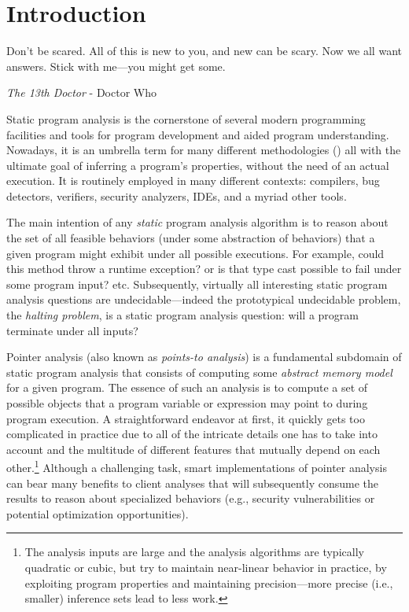 \chapter{Introduction}
\label{chapter:intro}
\epigraph{Don’t be scared. All of this is new to you, and new can be scary. Now we all want answers. Stick with me---you might get some.}{\textit{The 13th Doctor} - Doctor Who}

Static program analysis is the cornerstone of several modern programming facilities and tools for program development and aided program understanding. Nowadays, it is an umbrella term for many different methodologies (\todo{}) all with the ultimate goal of inferring a program's properties, without the need of an actual execution. It is routinely employed in many different contexts: compilers, bug detectors, verifiers, security analyzers, IDEs, and a myriad other tools.

The main intention of any \emph{static} program analysis algorithm is to reason about the set of all feasible behaviors (under some abstraction of behaviors) that a given program might exhibit under all possible executions. For example, could this method throw a runtime exception? or is that type cast possible to fail under some program input? etc. Subsequently, virtually all interesting static program analysis questions are undecidable---indeed the prototypical undecidable problem, the \emph{halting problem}, is a static program analysis question: will a program terminate under all inputs?

Pointer analysis (also known as \emph{points-to analysis}) is a fundamental subdomain of static program analysis that consists of computing some \emph{abstract memory model} for a given program. The essence of such an analysis is to compute a set of possible objects that a program variable or expression may point to during program execution. A straightforward endeavor at first, it quickly gets too complicated in practice due to all of the intricate details one has to take into account and the multitude of different features that mutually depend on each other.\footnote{The analysis inputs are large and the analysis algorithms are typically quadratic or cubic, but try to maintain near-linear behavior in practice, by exploiting program properties and maintaining precision---more precise (i.e., smaller) inference sets lead to less work.} Although a challenging task, smart implementations of pointer analysis can bear many benefits to client analyses that will subsequently consume the results to reason about specialized behaviors (e.g., security vulnerabilities or potential optimization opportunities).

